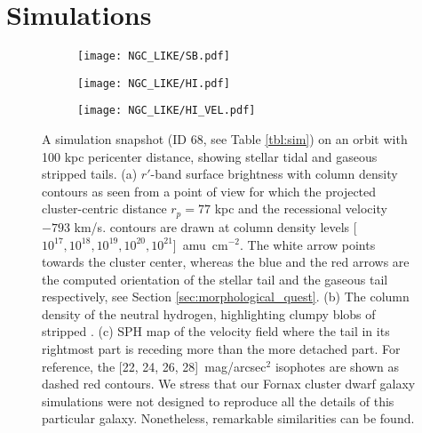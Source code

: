 

\section{Simulations} \label{sec:simulations}
\begin{figure}
\centering
\begin{subfigure}[b]{0.49\textwidth}
 \centering
 \texttt{[image: NGC\_LIKE/SB.pdf]}
 \caption{}
 \label{fig:sb_arrows}
\end{subfigure}
 \hfill
  \begin{subfigure}[b]{0.5\textwidth}
  \texttt{[image: NGC\_LIKE/HI.pdf]}
  \caption{}
  \label{fig:sim_hi_density}
\end{subfigure}
\hfill
\begin{subfigure}[b]{0.5\textwidth}
  \centering
  \texttt{[image: NGC\_LIKE/HI\_VEL.pdf]}
  \caption{}
  \label{fig:sim_hi_kin}
\end{subfigure}
 \vfill
\caption{A simulation snapshot (ID 68, see Table \ref{tbl:sim}) on an orbit with 100 kpc pericenter distance, showing stellar tidal and gaseous stripped tails.
(a) $r'$-band surface brightness with \Hi{} column density contours as seen from a point of view for which the projected cluster-centric distance $r_p = 77$ kpc and the recessional velocity $-793$ km/s. 
\Hi{} contours are drawn at column density levels [$10^{17}, 10^{18}, 10^{19}, 10^{20}, 10^{21}$]~amu~cm$^{-2}$. The white arrow points towards the cluster center, whereas the blue and the red arrows are the computed orientation of the stellar tail and the gaseous tail respectively, see Section \ref{sec:morphological_quest}.
(b) The column density of the neutral hydrogen, highlighting clumpy blobs of stripped \Hi{}.
(c) SPH map of the \Hi{} velocity field where the \Hi{} tail in its rightmost part is receding more than the more detached part.
For reference, the [22, 24, 26, 28]~mag/arcsec$^2$ isophotes are shown as dashed red contours.
We stress that our Fornax cluster dwarf galaxy simulations were not designed to reproduce all the details of this particular galaxy. Nonetheless, remarkable similarities can be found.} 

\label{fig:selected_snapshot}
\end{figure}

